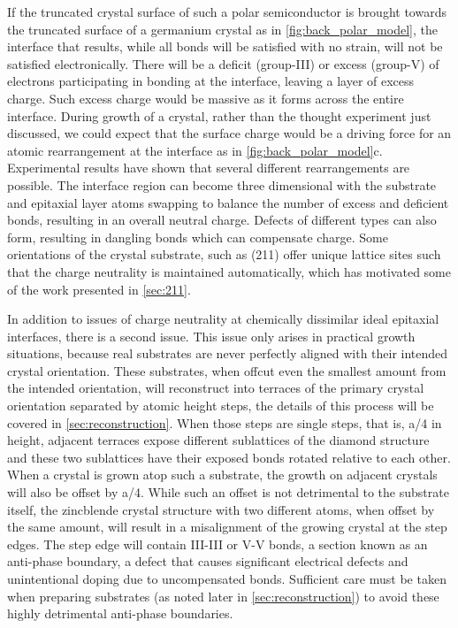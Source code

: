 If the truncated crystal surface of such a polar semiconductor is brought towards the truncated surface of a germanium crystal as in \cref{fig:back_polar_model}, the interface that results, while all bonds will be satisfied with no strain, will not be satisfied electronically.
There will be a deficit (group-III) or excess (group-V) of electrons participating in bonding at the interface, leaving a layer of excess charge.
Such excess charge would be massive as it forms across the entire interface.
During growth of a crystal, rather than the thought experiment just discussed, we could expect that the surface charge would be a driving force for an atomic rearrangement at the interface as in \cref{fig:back_polar_model}c.
Experimental results have shown that several different rearrangements are possible.
The interface region can become three dimensional with the substrate and epitaxial layer atoms swapping to balance the number of excess and deficient bonds, resulting in an overall neutral charge.
Defects of different types can also form, resulting in dangling bonds which can compensate charge.
Some orientations of the crystal substrate, such as (211) offer unique lattice sites such that the charge neutrality is maintained automatically, which has motivated some of the work presented in \cref{sec:211}.

In addition to issues of charge neutrality at chemically dissimilar ideal epitaxial interfaces, there is a second issue.
This issue only arises in practical growth situations, because real substrates are never perfectly aligned with their intended crystal orientation.
These substrates, when offcut even the smallest amount from the intended orientation, will reconstruct into terraces of the primary crystal orientation separated by atomic height steps, the details of this process will be covered in \cref{sec:reconstruction}.
When those steps are single steps, that is, a/4 in height, adjacent terraces expose different sublattices of the diamond structure and these two sublattices have their exposed bonds rotated relative to each other.
When a crystal is grown atop such a substrate, the growth on adjacent crystals will also be offset by a/4.
While such an offset is not detrimental to the substrate itself, the zincblende crystal structure with two different atoms, when offset by the same amount, will result in a misalignment of the growing crystal at the step edges.
The step edge will contain III-III or V-V bonds, a section known as an anti-phase boundary, a defect that causes significant electrical defects and unintentional doping due to uncompensated bonds.
Sufficient care must be taken when preparing substrates (as noted later in \cref{sec:reconstruction}) to avoid these highly detrimental anti-phase boundaries.

